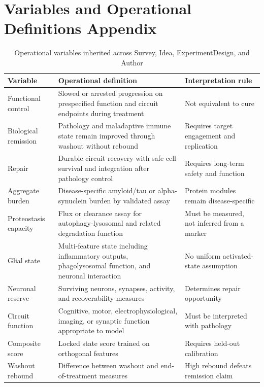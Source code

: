 \documentclass[conference]{IEEEtran}
\begin{document}
\section{Variables and Operational Definitions Appendix}
\begin{table}[h]
\caption{Operational variables inherited across Survey, Idea, ExperimentDesign, and Author}
\label{tab:variables}
\centering
\small
\begin{tabularx}{\textwidth}{p{}p{}X}
\toprule
Variable & Operational definition & Interpretation rule \\
\midrule
Functional control & Slowed or arrested progression on prespecified function and circuit endpoints during treatment & Not equivalent to cure \\
Biological remission & Pathology and maladaptive immune state remain improved through washout without rebound & Requires target engagement and replication \\
Repair & Durable circuit recovery with safe cell survival and integration after pathology control & Requires long-term safety and function \\
Aggregate burden & Disease-specific amyloid/tau or alpha-synuclein burden by validated assay & Protein modules remain disease-specific \\
Proteostasis capacity & Flux or clearance assay for autophagy-lysosomal and related degradation function & Must be measured, not inferred from a marker \\
Glial state & Multi-feature state including inflammatory outputs, phagolysosomal function, and neuronal interaction & No uniform activated-state assumption \\
Neuronal reserve & Surviving neurons, synapses, activity, and recoverability measures & Determines repair opportunity \\
Circuit function & Cognitive, motor, electrophysiological, imaging, or synaptic function appropriate to model & Must be interpreted with pathology \\
Composite score & Locked state score trained on orthogonal features & Requires held-out calibration \\
Washout rebound & Difference between washout and end-of-treatment measures & High rebound defeats remission claim \\
\bottomrule
\end{tabularx}
\end{table}
\end{document}
